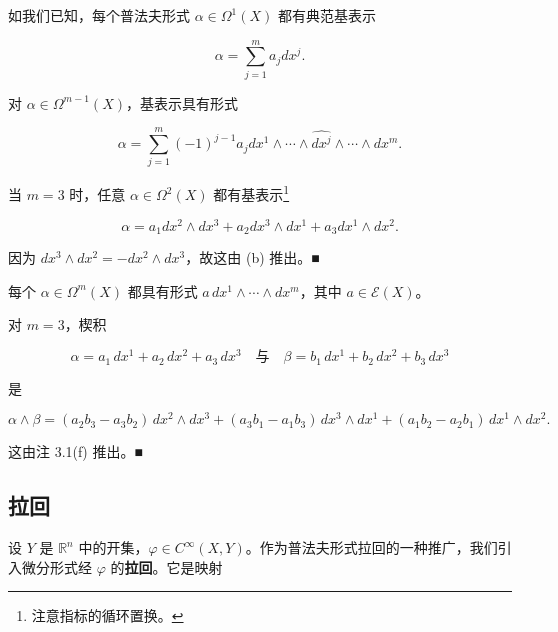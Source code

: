 \begin{example}

\begin{items}
\item

如我们已知，每个普法夫形式 $ \alpha \in \Omega^{1}(X) $ 都有典范基表示

\[
\alpha = \sum_{j=1}^{m} a_{j} dx^{j}.
\]
\item

对 $ \alpha \in \Omega^{m-1}(X) $，基表示具有形式

\[
\alpha = \sum_{j=1}^{m} (-1)^{j-1} a_{j} dx^{1} \wedge \cdots \wedge \widehat{dx^{j}} \wedge \cdots \wedge dx^{m}.
\]
\item

当 $ m = 3 $ 时，任意 $ \alpha \in \Omega^{2}(X) $ 都有基表示\footnote{注意指标的循环置换。}

\[
\alpha = a_{1} dx^{2} \wedge dx^{3} + a_{2} dx^{3} \wedge dx^{1} + a_{3} dx^{1} \wedge dx^{2}.
\]

\proofhead
因为 $ dx^{3} \wedge dx^{2} = -dx^{2} \wedge dx^{3} $，故这由 (b) 推出。\nobreak\hspace{0.35em}■
\item

每个 $ \alpha \in \Omega^{m}(X) $ 都具有形式 $ a\,dx^{1} \wedge \cdots \wedge dx^{m} $，其中 $ a \in \mathcal{E}(X) $。

\item

对 $ m = 3 $，楔积

\[
\alpha = a_{1}\,dx^{1} + a_{2}\,dx^{2} + a_{3}\,dx^{3} \quad \text{与} \quad \beta = b_{1}\,dx^{1} + b_{2}\,dx^{2} + b_{3}\,dx^{3}
\]

是

\[
\alpha \wedge \beta = (a_{2}b_{3} - a_{3}b_{2})\,dx^{2} \wedge dx^{3} + (a_{3}b_{1} - a_{1}b_{3})\,dx^{3} \wedge dx^{1} + (a_{1}b_{2} - a_{2}b_{1})\,dx^{1} \wedge dx^{2}.
\]

\proofhead
这由注 3.1(f) 推出。\nobreak\hspace{0.35em}■
\end{items}

\end{example}

\subsection*{拉回}

设 $ Y $ 是 $ \mathbb{R}^{n} $ 中的开集，$ \varphi \in C^{\infty}(X, Y) $。作为普法夫形式拉回的一种推广，我们引入微分形式经 $ \varphi $ 的\textbf{拉回}。它是映射

